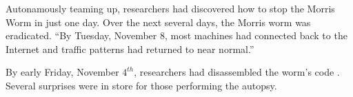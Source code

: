 Autonamously teaming up, researchers had discovered how to stop the Morris
Worm in just one day. Over the next several
days, the Morris worm was eradicated. ``By Tuesday, November 8, most machines had connected back to the Internet
and traffic patterns had returned to near normal.''\cite{spafford_internet_1989-1}

By early Friday, November $4^{th}$, researchers had disassembled the worm's
code 
\cite{spafford_crisis_1989}
\cite{seeley_tour_1989}.
Several surprises were in store for those performing the autopsy.